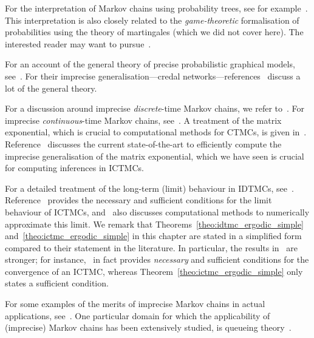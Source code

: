 \documentclass[graybox]{svmult}
\begin{document}
For the interpretation of Markov chains using probability trees, see for example~\cite{decooman:2008, destercke:2008, stavros:phd:2017}. This interpretation is also closely related to the \emph{game-theoretic} formalisation of probabilities using the theory of martingales (which we did not cover here). The interested reader may want to pursue~\cite{decooman:2008, chap:game_theo:itip, stavros:phd:2017}.

For an account of the general theory of precise probabilistic graphical models, see~\cite{pearl:1988}. For their imprecise generalisation---credal networks---references~\cite{cozman:2000, cozman:2005, chap_pgm:itip, de2015credal, debock:2017} discuss a lot of the general theory.

For a discussion around imprecise \emph{discrete}-time Markov chains, we refer to~\cite{deCooman:2010gd, augustin2013:itip, decooman:2016}. For imprecise \emph{continuous}-time Markov chains, see~\cite{Skulj:2015cq, krak2016ictmc}. A treatment of the matrix exponential, which is crucial to computational methods for CTMCs, is given in~\cite{vanloan:1975}. Reference~\cite{erreygers2017imprecise} discusses the current state-of-the-art to efficiently compute the imprecise generalisation of the matrix exponential, which we have seen is crucial for computing inferences in ICTMCs.

For a detailed treatment of the long-term (limit) behaviour in IDTMCs, see~\cite{decooman:2009, hermans:2012, skulv:2013, decooman:2015}. Reference~\cite{DeBock:2016} provides the necessary and sufficient conditions for the limit behaviour of ICTMCs, and~\cite{erreygers2017imprecise} also discusses computational methods to numerically approximate this limit. We remark that Theorems~\ref{theo:idtmc_ergodic_simple} and~\ref{theo:ictmc_ergodic_simple} in this chapter are stated in a simplified form compared to their statement in the literature. In particular, the results in~\cite{decooman:2009,DeBock:2016} are stronger; for instance,~\cite{DeBock:2016} in fact provides \emph{necessary} and sufficient conditions for the convergence of an ICTMC, whereas Theorem~\ref{theo:ictmc_ergodic_simple} only states a sufficient condition.

For some examples of the merits of imprecise Markov chains in actual applications, see~\cite{soullard2017, troffaes2015using, rottondi:2017}. One particular domain for which the applicability of (imprecise) Markov chains has been extensively studied, is queueing theory~\cite{crossman:2009, lopatatzidis:2015b:isipta, lopatatzidis:2015:isipta, lopatatzidis2016queue, lopatatzidis:2017:journal}.
\end{document}
